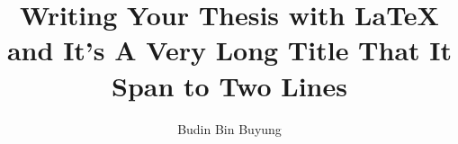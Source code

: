 \documentclass{unimapcgs}
\author{Budin Bin Buyung}
\title{Writing Your Thesis with LaTeX and It's A Very Long Title That It Span to Two Lines}
\begin{document}
%


\frontmatter

\makecover

\declaration



\begin{singlespace}
\tableofcontents \clearpage
\listoftables \clearpage
\listoffigures \clearpage


\end{singlespace}




\setlength\parskip{18pt}
\setlength\intextsep{18pt}


\mainmatter

%
%  
%  
%



	
\end{document}
